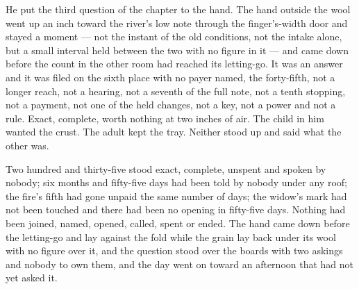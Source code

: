He put the third question of the chapter to the hand. The hand outside the wool went up an inch toward the river's low note through the finger's-width door and stayed a moment --- not the instant of the old conditions, not the intake alone, but a small interval held between the two with no figure in it --- and came down before the count in the other room had reached its letting-go. It was an answer and it was filed on the sixth place with no payer named, the forty-fifth, not a longer reach, not a hearing, not a seventh of the full note, not a tenth stopping, not a payment, not one of the held changes, not a key, not a power and not a rule. Exact, complete, worth nothing at two inches of air. The child in him wanted the crust. The adult kept the tray. Neither stood up and said what the other was.

Two hundred and thirty-five stood exact, complete, unspent and spoken by nobody; six months and fifty-five days had been told by nobody under any roof; the fire's fifth had gone unpaid the same number of days; the widow's mark had not been touched and there had been no opening in fifty-five days. Nothing had been joined, named, opened, called, spent or ended. The hand came down before the letting-go and lay against the fold while the grain lay back under its wool with no figure over it, and the question stood over the boards with two askings and nobody to own them, and the day went on toward an afternoon that had not yet asked it.
